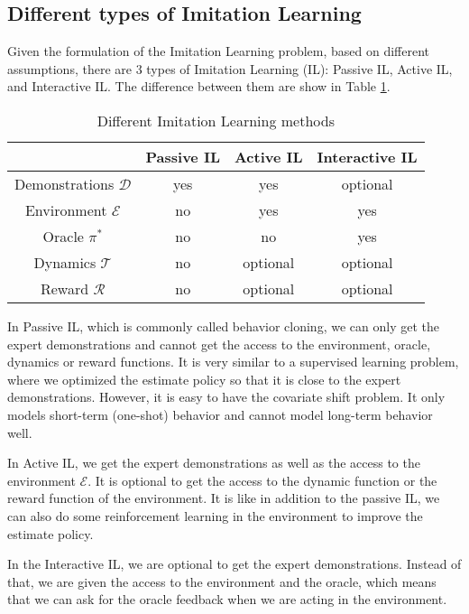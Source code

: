 \documentclass[11pt]{article}
\begin{document}
\subsection{Different types of Imitation Learning}

Given the formulation of the Imitation Learning problem, based on different assumptions, there are 3 types of Imitation Learning (IL): Passive IL, Active IL, and Interactive IL. The difference between them are show in Table \ref{tab:Imitation}. 
\begin{table}[H]
    \centering
    \begin{tabular}{|c|c|c|c|}
         \hline
         & Passive IL & Active IL & Interactive IL \\
         \hline
        Demonstrations $\mathcal{D}$ & yes & yes & optional \\
        \hline
        Environment $\mathcal{E}$ & no & yes & yes \\
        \hline
        Oracle $\pi^*$ & no & no & yes \\
        \hline
        Dynamics $\mathcal{T}$ & no & optional & optional \\
        \hline
        Reward $\mathcal{R}$ & no & optional & optional\\
        \hline
    \end{tabular}
    \caption{Different Imitation Learning methods}
    \label{tab:Imitation}
\end{table}

In Passive IL, which is commonly called behavior cloning, we can only get the expert demonstrations and cannot get the access to the environment, oracle, dynamics or reward functions. It is very similar to a supervised learning problem, where we optimized the estimate policy so that it is close to the expert demonstrations. However, it is easy to have the covariate shift problem. It only models short-term (one-shot) behavior and cannot model long-term behavior well.

In Active IL, we get the expert demonstrations as well as the access to the environment $\mathcal{E}$. It is optional to get the access to the dynamic function or the reward function of the environment. It is like in addition to the passive IL, we can also do some reinforcement learning in the environment to improve the estimate policy.

In the Interactive IL, we are optional to get the expert demonstrations. Instead of that, we are given the access to the environment and the oracle, which means that we can ask for the oracle feedback when we are acting in the environment.
\end{document}
